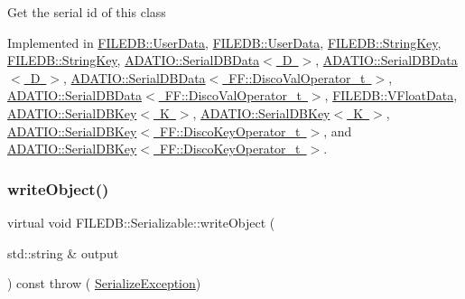 Get the serial id of this class 

Implemented in \mbox{\hyperlink{classFILEDB_1_1UserData_a2d1cee48b497ef3f25957ecb1464b7f5}{F\+I\+L\+E\+D\+B\+::\+User\+Data}}, \mbox{\hyperlink{classFILEDB_1_1UserData_a2d1cee48b497ef3f25957ecb1464b7f5}{F\+I\+L\+E\+D\+B\+::\+User\+Data}}, \mbox{\hyperlink{classFILEDB_1_1StringKey_ad139b5cab667be479edae524f436805a}{F\+I\+L\+E\+D\+B\+::\+String\+Key}}, \mbox{\hyperlink{classFILEDB_1_1StringKey_ad139b5cab667be479edae524f436805a}{F\+I\+L\+E\+D\+B\+::\+String\+Key}}, \mbox{\hyperlink{classADATIO_1_1SerialDBData_a513643be38434a570d655602330aade9}{A\+D\+A\+T\+I\+O\+::\+Serial\+D\+B\+Data$<$ D $>$}}, \mbox{\hyperlink{classADATIO_1_1SerialDBData_a513643be38434a570d655602330aade9}{A\+D\+A\+T\+I\+O\+::\+Serial\+D\+B\+Data$<$ D $>$}}, \mbox{\hyperlink{classADATIO_1_1SerialDBData_a513643be38434a570d655602330aade9}{A\+D\+A\+T\+I\+O\+::\+Serial\+D\+B\+Data$<$ F\+F\+::\+Disco\+Val\+Operator\+\_\+t $>$}}, \mbox{\hyperlink{classADATIO_1_1SerialDBData_a513643be38434a570d655602330aade9}{A\+D\+A\+T\+I\+O\+::\+Serial\+D\+B\+Data$<$ F\+F\+::\+Disco\+Val\+Operator\+\_\+t $>$}}, \mbox{\hyperlink{classFILEDB_1_1VFloatData_a63b06bc5c69783fcbb4ab699b2633815}{F\+I\+L\+E\+D\+B\+::\+V\+Float\+Data}}, \mbox{\hyperlink{classADATIO_1_1SerialDBKey_a0d088e08f453fd38a906208783f788d7}{A\+D\+A\+T\+I\+O\+::\+Serial\+D\+B\+Key$<$ K $>$}}, \mbox{\hyperlink{classADATIO_1_1SerialDBKey_a0d088e08f453fd38a906208783f788d7}{A\+D\+A\+T\+I\+O\+::\+Serial\+D\+B\+Key$<$ K $>$}}, \mbox{\hyperlink{classADATIO_1_1SerialDBKey_a0d088e08f453fd38a906208783f788d7}{A\+D\+A\+T\+I\+O\+::\+Serial\+D\+B\+Key$<$ F\+F\+::\+Disco\+Key\+Operator\+\_\+t $>$}}, and \mbox{\hyperlink{classADATIO_1_1SerialDBKey_a0d088e08f453fd38a906208783f788d7}{A\+D\+A\+T\+I\+O\+::\+Serial\+D\+B\+Key$<$ F\+F\+::\+Disco\+Key\+Operator\+\_\+t $>$}}.

\mbox{\label{classFILEDB_1_1Serializable_a8deaa86e108c08c863881e46cf5578ea}} 
\subsubsection{\texorpdfstring{writeObject()}{writeObject()}\hspace{0.1cm}{\footnotesize\ttfamily [1/2]}}
{\footnotesize\ttfamily virtual void F\+I\+L\+E\+D\+B\+::\+Serializable\+::write\+Object (\begin{DoxyParamCaption}\item[{std\+::string \&}]{output }\end{DoxyParamCaption}) const throw ( \mbox{\hyperlink{classFILEDB_1_1SerializeException}{Serialize\+Exception}}) \hspace{0.3cm}{\ttfamily [pure virtual]}}

